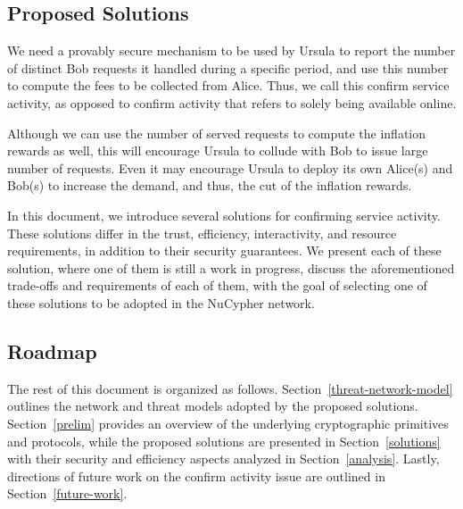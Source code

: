 \subsection{Proposed Solutions}
We need a provably secure mechanism to be used by Ursula to report the 
number of distinct Bob requests it handled during a specific period, and use this number 
to compute the fees to be collected from Alice. Thus, we call this confirm 
service activity, as opposed to confirm activity that refers to solely being available 
online.


Although we can use the number of served requests to compute the inflation 
rewards as well, this will encourage Ursula to collude with Bob to issue large 
number of requests. Even it may encourage Ursula to deploy its own Alice(s) 
and Bob(s) to increase the demand, and thus, the cut of the inflation rewards.


In this document, we introduce several solutions for confirming service activity. 
These solutions differ in the trust, efficiency, interactivity, and resource 
requirements, in addition to their security guarantees. We present each of these 
solution, where one of them is still a work in progress, discuss the aforementioned 
trade-offs and requirements of each of them, with the goal of selecting one of these 
solutions to be adopted in the NuCypher network.


\subsection{Roadmap}
The rest of this document is organized as follows. Section~\ref{threat-network-model} 
outlines the network and threat models adopted by the proposed solutions. 
Section~\ref{prelim} provides an overview of the underlying cryptographic primitives and 
protocols, while the proposed solutions are presented 
in Section~\ref{solutions} with their security and efficiency aspects analyzed in 
Section~\ref{analysis}. Lastly, directions of future work on the confirm activity issue 
are outlined in Section~\ref{future-work}.



